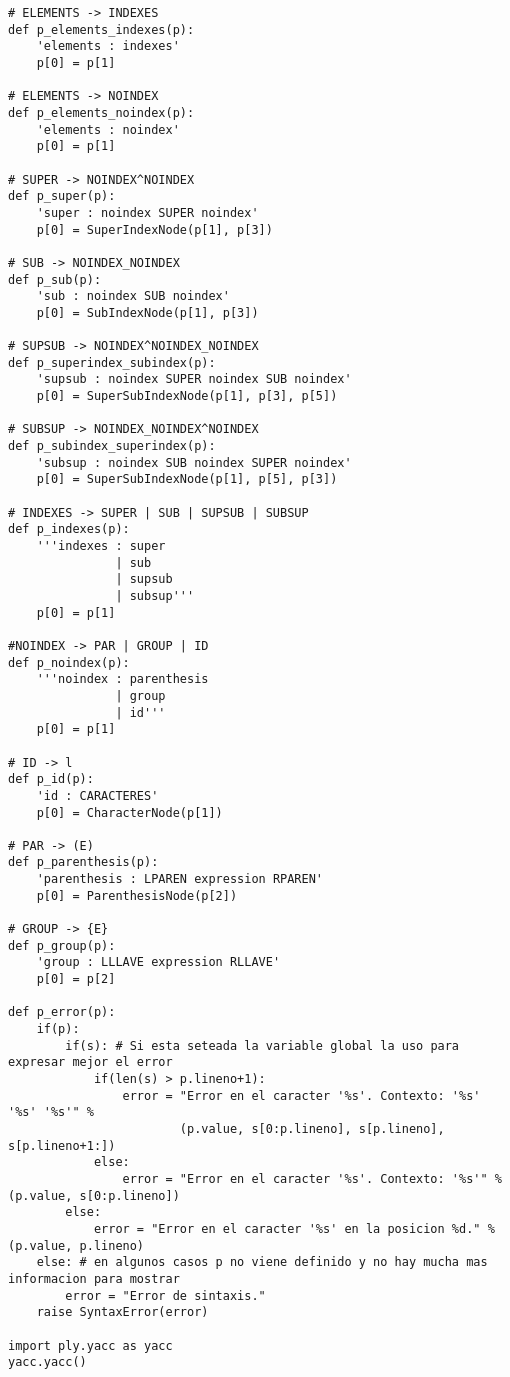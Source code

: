 \begin{verbatim}
# ELEMENTS -> INDEXES
def p_elements_indexes(p):
    'elements : indexes'
    p[0] = p[1]

# ELEMENTS -> NOINDEX
def p_elements_noindex(p):
    'elements : noindex'
    p[0] = p[1]

# SUPER -> NOINDEX^NOINDEX
def p_super(p):
    'super : noindex SUPER noindex'
    p[0] = SuperIndexNode(p[1], p[3])

# SUB -> NOINDEX_NOINDEX
def p_sub(p):
    'sub : noindex SUB noindex'
    p[0] = SubIndexNode(p[1], p[3])

# SUPSUB -> NOINDEX^NOINDEX_NOINDEX
def p_superindex_subindex(p):
    'supsub : noindex SUPER noindex SUB noindex'
    p[0] = SuperSubIndexNode(p[1], p[3], p[5])

# SUBSUP -> NOINDEX_NOINDEX^NOINDEX
def p_subindex_superindex(p):
    'subsup : noindex SUB noindex SUPER noindex'
    p[0] = SuperSubIndexNode(p[1], p[5], p[3])

# INDEXES -> SUPER | SUB | SUPSUB | SUBSUP
def p_indexes(p):
    '''indexes : super
               | sub
               | supsub
               | subsup'''
    p[0] = p[1]

#NOINDEX -> PAR | GROUP | ID
def p_noindex(p):
    '''noindex : parenthesis
               | group
               | id'''
    p[0] = p[1]

# ID -> l
def p_id(p):
    'id : CARACTERES'
    p[0] = CharacterNode(p[1])

# PAR -> (E)
def p_parenthesis(p):
    'parenthesis : LPAREN expression RPAREN'
    p[0] = ParenthesisNode(p[2])

# GROUP -> {E}
def p_group(p):
    'group : LLLAVE expression RLLAVE'
    p[0] = p[2]

def p_error(p):
    if(p):
        if(s): # Si esta seteada la variable global la uso para expresar mejor el error
            if(len(s) > p.lineno+1):
                error = "Error en el caracter '%s'. Contexto: '%s' '%s' '%s'" % 
                		(p.value, s[0:p.lineno], s[p.lineno], s[p.lineno+1:])
            else:
                error = "Error en el caracter '%s'. Contexto: '%s'" % (p.value, s[0:p.lineno])
        else:
            error = "Error en el caracter '%s' en la posicion %d." % (p.value, p.lineno)
    else: # en algunos casos p no viene definido y no hay mucha mas informacion para mostrar
        error = "Error de sintaxis."
    raise SyntaxError(error)

import ply.yacc as yacc
yacc.yacc()


\end{verbatim}
